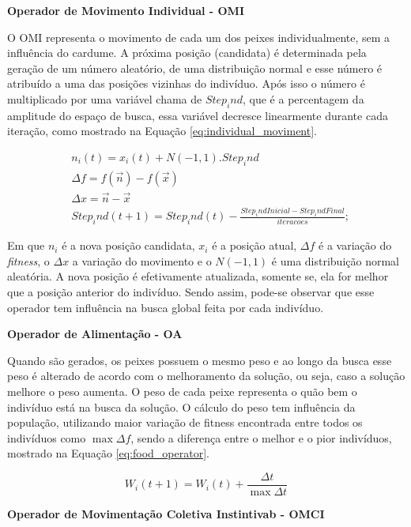 \noindent \textbf{Operador de Movimento Individual - OMI}

O OMI representa o movimento de cada um dos peixes individualmente, sem a influência do cardume. A próxima posição (candidata) é determinada pela geração de um número aleatório, de uma distribuição normal e esse número é atribuído a uma das posições vizinhas do indivíduo. Após isso o número é multiplicado por uma variável chama de $Step_ind$, que é a percentagem da amplitude do espaço de busca, essa variável decresce linearmente durante cada iteração, como mostrado na Equação \ref{eq:individual_moviment}.

\begin{equation}
\label{eq:individual_moviment}
\begin{split}
& n_i(t) = x_i(t) + N(-1,1).Step_ind \\
& \Delta f = f(\vec{n}) - f(\vec{x}) \\
& \Delta x = \vec{n} - \vec{x} \\
& Step_ind(t+1) = Step_ind(t) - \frac{Step_indInicial - Step_indFinal}{iteracoes};
\end{split}
\end{equation}

\noindent Em que $n_i$ é a nova posição candidata, $x_i$ é a posição atual, $\Delta f$ é a variação do \textit{fitness}, o $\Delta x$ a variação do movimento e o $N(-1,1)$ é uma distribuição normal aleatória. A nova posição é efetivamente atualizada, somente se, ela for melhor que a posição anterior do indivíduo. Sendo assim, pode-se observar que esse operador tem influência na busca global feita por cada indivíduo.

\noindent \textbf{Operador de Alimentação - OA}

Quando são gerados, os peixes possuem o mesmo peso e ao longo da busca esse peso é alterado de acordo com o melhoramento da solução, ou seja, caso a solução melhore o peso aumenta. O peso de cada peixe representa o quão bem o indivíduo está na busca da solução. O cálculo do peso tem influência da população, utilizando maior variação de fitness encontrada entre todos os indivíduos como $\max{\Delta f}$, sendo a diferença entre o melhor e o pior indivíduos, mostrado na Equação \ref{eq:food_operator}.

\begin{equation}
\label{eq:food_operator}
W_i(t+1) = W_i(t) + \frac{\Delta t}{\max{\Delta t}}
\end{equation}

\noindent \textbf{Operador de Movimentação Coletiva Instintivab - OMCI}

